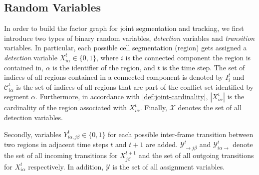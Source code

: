 \subsection{Random Variables}
In order to build the factor graph for joint segmentation and tracking, we first introduce two types
of binary random variables, \emph{detection} variables and \emph{transition} variables.
In particular, each possible cell segmentation (region) gets assigned a \emph{detection} variable
$X_{i\alpha}^t \in \{0,1\}$, where $i$ is the connected component the region is contained in,
$\alpha$ is the identifier of the region, and $t$ is the time step. The set of indices of all regions
contained in a connected component is denoted by $I_i^t$ and $\mathcal{C}_{i\alpha}^t$ is the set of
indices of all regions that are part of the conflict set identified by segment
$\alpha$. Furthermore, in accordance with \cref{def:joint-cardinality}, $|X_{i\alpha}^t|$ is the
cardinality of the region associated with $X_{i\alpha}^t$. Finally, $\mathcal{X}$ denotes the set of
all detection variables.

Secondly, variables $Y_{i\alpha,j\beta}^{t} \in \{0,1\}$ for each possible inter-frame transition
between two regions in adjacent time steps $t$ and $t+1$ are added. $\mathcal{Y}_{\rightarrow
    j\beta}^{t}$ and $\mathcal{Y}_{i\alpha \rightarrow}^{t}$ denote the set of all incoming
transitions for $X_{j\beta}^{t+1}$ and the set of all outgoing transitions for $X_{i\alpha}^{t}$
respectively. In addition, $\mathcal{Y}$ is the set of all assignment variables.


